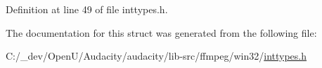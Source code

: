 Definition at line 49 of file inttypes.\+h.



The documentation for this struct was generated from the following file\+:\begin{DoxyCompactItemize}
\item 
C\+:/\+\_\+dev/\+Open\+U/\+Audacity/audacity/lib-\/src/ffmpeg/win32/\hyperlink{ffmpeg_2win32_2inttypes_8h}{inttypes.\+h}\end{DoxyCompactItemize}
